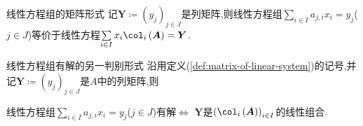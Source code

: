 \begin{remark}{线性方程组的矩阵形式}{}
	记$\boldsymbol{Y}\coloneq\left(y_{j}\right)_{j\in J}$是列矩阵,则线性方程组$\sum\limits_{i\in I}a_{j,i}x_{i}=y_{j}$($j\in J$)等价于线性方程$\sum\limits_{i\in I}x_{i}\col_{i}\left(\boldsymbol{A}\right)=\boldsymbol{Y}$.
\end{remark}

\begin{theorem}{线性方程组有解的另一判别形式}{}
	沿用定义(\ref{def:matrix-of-linear-system})的记号,并记$\boldsymbol{Y}\coloneq\left(y_{j}\right)_{j\in J}$是$A$中的列矩阵,则
	\begin{center}
		线性方程组$\sum\limits_{i\in I}a_{j,i}x_{i}=y_{j}$($j\in J$)有解$\iff$ $\boldsymbol{Y}$是$\left(\col_{i}\left(\boldsymbol{A}\right)\right)_{i\in I}$的线性组合.
	\end{center}
\end{theorem}